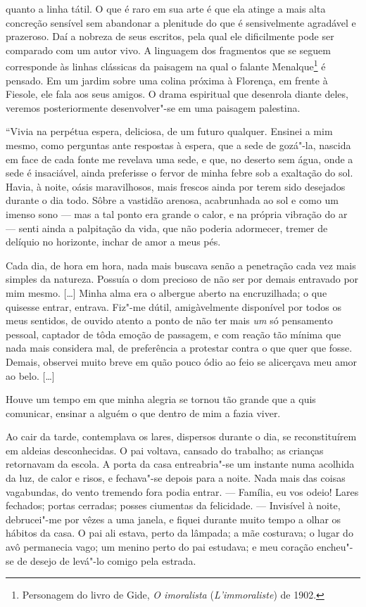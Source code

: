 quanto a linha tátil. O que é raro em sua arte é que ela atinge
a mais alta concreção sensível sem abandonar a plenitude do que é
sensivelmente agradável e prazeroso. Daí a nobreza de seus escritos, pela
qual ele dificilmente pode ser comparado com um autor vivo. A
linguagem dos fragmentos que se seguem corresponde às linhas clássicas
da paisagem na qual o falante Menalque\footnote{Personagem do
  livro de Gide, \emph{O imoralista} (\emph{L'immoraliste}) de 1902. \versal{[N. T.]}} é
pensado. Em um jardim sobre uma colina próxima à Florença, em frente à
Fiesole, ele fala aos seus amigos. O drama espiritual que desenrola
diante deles, veremos posteriormente desenvolver"-se em uma paisagem
palestina.

``Vivia na perpétua espera, deliciosa, de um futuro qualquer. Ensinei a
mim mesmo, como perguntas ante respostas à espera, que a sede de
gozá"-la, nascida em face de cada fonte me revelava uma sede, e que, no
deserto sem água, onde a sede é insaciável, ainda preferisse o fervor de
minha febre sob a exaltação do sol. Havia, à noite, oásis maravilhosos,
mais frescos ainda por terem sido desejados durante o dia todo. Sôbre a
vastidão arenosa, acabrunhada ao sol e como um imenso sono --- mas a tal
ponto era grande o calor, e na própria vibração do ar --- senti ainda a
palpitação da vida, que não poderia adormecer, tremer de delíquio no
horizonte, inchar de amor a meus pés.

Cada dia, de hora em hora, nada mais buscava senão a penetração cada vez
mais simples da natureza. Possuía o dom precioso de não ser por demais
entravado por mim mesmo. {[}\ldots{}{]} Minha alma era o albergue aberto na
encruzilhada; o que quisesse entrar, entrava. Fiz"-me dútil,
amigàvelmente disponível por todos os meus sentidos, de ouvido atento a
ponto de não ter mais \emph{um} só pensamento pessoal, captador de tôda
emoção de passagem, e com reação tão mínima que nada mais considera mal,
de preferência a protestar contra o que quer que fosse. Demais, observei
muito breve em quão pouco ódio ao feio se alicerçava meu amor ao belo.
{[}\ldots{}{]}

Houve um tempo em que minha alegria se tornou tão grande que a quis
comunicar, ensinar a alguém o que dentro de mim a fazia viver.

Ao cair da tarde, contemplava os lares, dispersos durante o dia, se
reconstituírem em aldeias desconhecidas. O pai voltava, cansado do
trabalho; as crianças retornavam da escola. A porta da casa
entreabria"-se um instante numa acolhida da luz, de calor e risos, e
fechava"-se depois para a noite. Nada mais das coisas vagabundas, do
vento tremendo fora podia entrar. --- Família, eu vos odeio! Lares
fechados; portas cerradas; posses ciumentas da felicidade. --- Invisível
à noite, debrucei"-me por vêzes a uma janela, e fiquei durante muito
tempo a olhar os hábitos da casa. O pai ali estava, perto da lâmpada; a
mãe costurava; o lugar do avô permanecia vago; um menino perto do pai
estudava; e meu coração encheu"-se de desejo de levá"-lo comigo pela
estrada.

